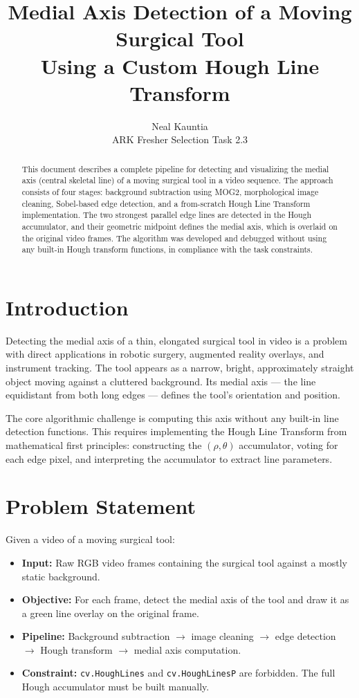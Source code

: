 \documentclass[journal]{IEEEtran}
\title{Medial Axis Detection of a Moving Surgical Tool\\Using a Custom Hough Line Transform}
\author{Neal Kauntia\\ ARK Fresher Selection Task 2.3}
\begin{document}
\maketitle

\begin{abstract}
This document describes a complete pipeline for detecting and visualizing the medial 
axis (central skeletal line) of a moving surgical tool in a video sequence. The 
approach consists of four stages: background subtraction using MOG2, morphological 
image cleaning, Sobel-based edge detection, and a from-scratch Hough Line Transform 
implementation. The two strongest parallel edge lines are detected in the Hough 
accumulator, and their geometric midpoint defines the medial axis, which is overlaid 
on the original video frames. The algorithm was developed and debugged without using 
any built-in Hough transform functions, in compliance with the task constraints.
\end{abstract}

\section{Introduction}
Detecting the medial axis of a thin, elongated surgical tool in video is a problem 
with direct applications in robotic surgery, augmented reality overlays, and 
instrument tracking. The tool appears as a narrow, bright, approximately straight 
object moving against a cluttered background. Its medial axis — the line equidistant 
from both long edges — defines the tool's orientation and position.

The core algorithmic challenge is computing this axis without any built-in line 
detection functions. This requires implementing the Hough Line Transform from 
mathematical first principles: constructing the $(\rho, \theta)$ accumulator, 
voting for each edge pixel, and interpreting the accumulator to extract line parameters.

\section{Problem Statement}
Given a video of a moving surgical tool:
\begin{itemize}
    \item \textbf{Input:} Raw RGB video frames containing the surgical tool against 
    a mostly static background.
    \item \textbf{Objective:} For each frame, detect the medial axis of the tool 
    and draw it as a green line overlay on the original frame.
    \item \textbf{Pipeline:} Background subtraction $\rightarrow$ image cleaning 
    $\rightarrow$ edge detection $\rightarrow$ Hough transform $\rightarrow$ 
    medial axis computation.
    \item \textbf{Constraint:} \texttt{cv.HoughLines} and \texttt{cv.HoughLinesP} 
    are forbidden. The full Hough accumulator must be built manually.
\end{itemize}
\end{document}

